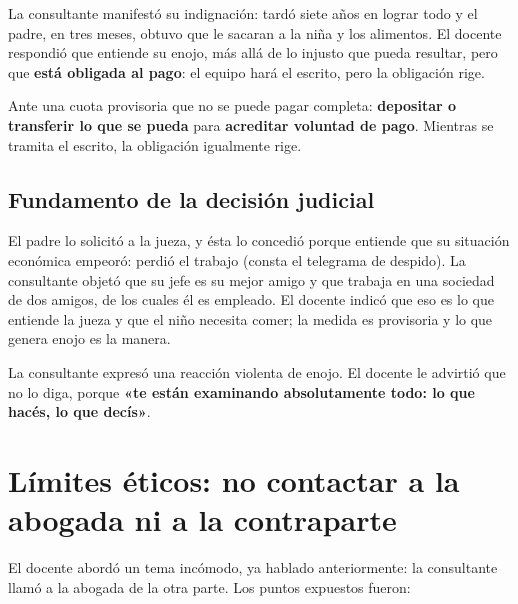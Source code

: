 \documentclass[12pt,oneside]{book}
\begin{document}
La consultante manifestó su indignación: tardó siete años en lograr todo y el padre, en tres meses, obtuvo que le sacaran a la niña y los alimentos. El docente respondió que entiende su enojo, más allá de lo injusto que pueda resultar, pero que \textbf{está obligada al pago}: el equipo hará el escrito, pero la obligación rige.

\begin{important}
Ante una cuota provisoria que no se puede pagar completa: \textbf{depositar o transferir lo que se pueda} para \textbf{acreditar voluntad de pago}. Mientras se tramita el escrito, la obligación igualmente rige.
\end{important}

\subsection{Fundamento de la decisión judicial}

El padre lo solicitó a la jueza, y ésta lo concedió porque entiende que su situación económica empeoró: perdió el trabajo (consta el telegrama de despido). La consultante objetó que su jefe es su mejor amigo y que trabaja en una sociedad de dos amigos, de los cuales él es empleado. El docente indicó que eso es lo que entiende la jueza y que el niño necesita comer; la medida es provisoria y lo que genera enojo es la manera.

La consultante expresó una reacción violenta de enojo. El docente le advirtió que no lo diga, porque \textbf{«te están examinando absolutamente todo: lo que hacés, lo que decís»}.

\section{Límites éticos: no contactar a la abogada ni a la contraparte}

El docente abordó un tema incómodo, ya hablado anteriormente: la consultante llamó a la abogada de la otra parte. Los puntos expuestos fueron:
\end{document}
